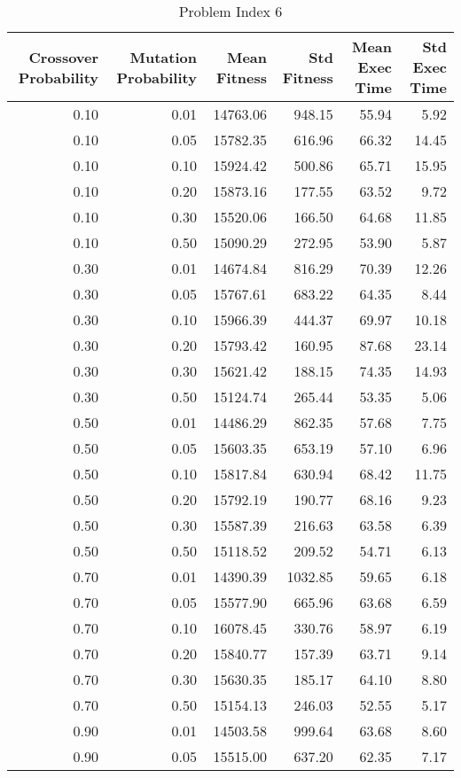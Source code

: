 \begin{table}
\caption{Problem Index 6}
\label{tab:problem_6}
\begin{tabular}{rrrrrr}
\toprule
Crossover Probability & Mutation Probability & Mean Fitness & Std Fitness & Mean Exec Time & Std Exec Time \\
\midrule
0.10 & 0.01 & 14763.06 & 948.15 & 55.94 & 5.92 \\
0.10 & 0.05 & 15782.35 & 616.96 & 66.32 & 14.45 \\
0.10 & 0.10 & 15924.42 & 500.86 & 65.71 & 15.95 \\
0.10 & 0.20 & 15873.16 & 177.55 & 63.52 & 9.72 \\
0.10 & 0.30 & 15520.06 & 166.50 & 64.68 & 11.85 \\
0.10 & 0.50 & 15090.29 & 272.95 & 53.90 & 5.87 \\
0.30 & 0.01 & 14674.84 & 816.29 & 70.39 & 12.26 \\
0.30 & 0.05 & 15767.61 & 683.22 & 64.35 & 8.44 \\
0.30 & 0.10 & 15966.39 & 444.37 & 69.97 & 10.18 \\
0.30 & 0.20 & 15793.42 & 160.95 & 87.68 & 23.14 \\
0.30 & 0.30 & 15621.42 & 188.15 & 74.35 & 14.93 \\
0.30 & 0.50 & 15124.74 & 265.44 & 53.35 & 5.06 \\
0.50 & 0.01 & 14486.29 & 862.35 & 57.68 & 7.75 \\
0.50 & 0.05 & 15603.35 & 653.19 & 57.10 & 6.96 \\
0.50 & 0.10 & 15817.84 & 630.94 & 68.42 & 11.75 \\
0.50 & 0.20 & 15792.19 & 190.77 & 68.16 & 9.23 \\
0.50 & 0.30 & 15587.39 & 216.63 & 63.58 & 6.39 \\
0.50 & 0.50 & 15118.52 & 209.52 & 54.71 & 6.13 \\
0.70 & 0.01 & 14390.39 & 1032.85 & 59.65 & 6.18 \\
0.70 & 0.05 & 15577.90 & 665.96 & 63.68 & 6.59 \\
0.70 & 0.10 & 16078.45 & 330.76 & 58.97 & 6.19 \\
0.70 & 0.20 & 15840.77 & 157.39 & 63.71 & 9.14 \\
0.70 & 0.30 & 15630.35 & 185.17 & 64.10 & 8.80 \\
0.70 & 0.50 & 15154.13 & 246.03 & 52.55 & 5.17 \\
0.90 & 0.01 & 14503.58 & 999.64 & 63.68 & 8.60 \\
0.90 & 0.05 & 15515.00 & 637.20 & 62.35 & 7.17 \\

\end{tabular}
\end{table}
